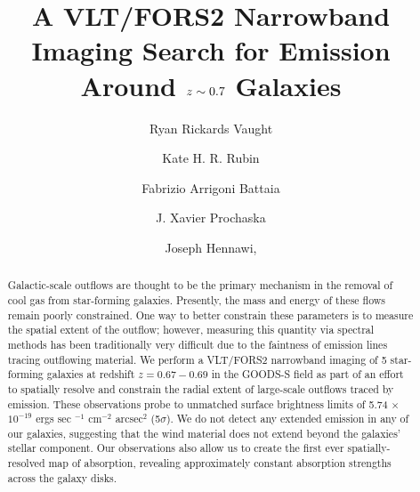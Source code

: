 \documentclass[twocolumn]{aastex61}
\begin{document}
\title{A VLT/FORS2 Narrowband Imaging Search for  Emission Around $\lowercase{z}\sim0.7$ Galaxies }
\author{Ryan Rickards Vaught}
 
 \author{Kate H. R. Rubin }
 
 \author{Fabrizio Arrigoni Battaia }

 \author{J. Xavier Prochaska}
 
\author{Joseph Hennawi,}


\begin{abstract}

Galactic-scale outflows are thought to be the primary mechanism in the removal of cool gas from star-forming galaxies. Presently, the mass and energy of these flows remain poorly constrained. One way to better constrain these parameters is to measure the spatial extent of the outflow; however, measuring this quantity via spectral methods has been traditionally very difficult due to the faintness of emission lines tracing outflowing material. We perform a VLT/FORS2 narrowband imaging of 5 star-forming galaxies at redshift $z=0.67-0.69$ in the GOODS-S field as part of an effort to spatially resolve and constrain the radial extent of large-scale outflows traced by  emission. These observations probe  to unmatched surface brightness limits of 5.74 $\times$ $10^{-19}$ ergs sec $^{-1}$ cm$^{-2}$ arcsec$^2$ (5$\sigma$). We do not detect any extended  emission in any of our galaxies, suggesting that the wind material does not extend beyond the galaxies' stellar component. Our observations also allow us to create the first ever spatially-resolved map of   absorption, revealing approximately constant absorption strengths across the galaxy disks.

\end{abstract}

\end{document}
